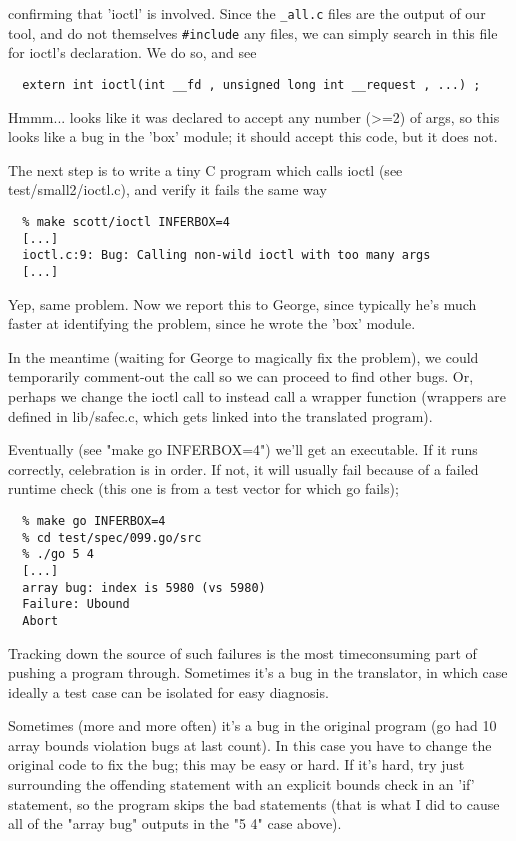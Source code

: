 \documentclass{book}
\def\t#1{{\tt #1}}
\begin{document}
confirming that 'ioctl' is involved.  Since the \t{*\_all.c} files are the
output of our tool, and do not themselves \t{\#include} any files, we can
simply search in this file for ioctl's declaration.  We do so, and see

\begin{verbatim}
  extern int ioctl(int __fd , unsigned long int __request , ...) ;
\end{verbatim}
  
Hmmm... looks like it was declared to accept any number (>=2) of args, so
this looks like a bug in the 'box' module; it should accept this code,
but it does not.

The next step is to write a tiny C program which calls ioctl (see
test/small2/ioctl.c), and verify it fails the same way

\begin{verbatim}
  % make scott/ioctl INFERBOX=4
  [...]
  ioctl.c:9: Bug: Calling non-wild ioctl with too many args
  [...]
\end{verbatim}
  
Yep, same problem.  Now we report this to George, since typically he's
much faster at identifying the problem, since he wrote the 'box' module.

In the meantime (waiting for George to magically fix the problem), we
could temporarily comment-out the call so we can proceed to find other
bugs.  Or, perhaps we change the ioctl call to instead call a wrapper
function (wrappers are defined in lib/safec.c, which gets linked into
the translated program).

Eventually (see "make go INFERBOX=4") we'll get an executable.  If it
runs correctly, celebration is in order.  If not, it will usually fail
because of a failed runtime check (this one is from a test vector for
which go fails);

\begin{verbatim}
  % make go INFERBOX=4
  % cd test/spec/099.go/src
  % ./go 5 4
  [...]
  array bug: index is 5980 (vs 5980)
  Failure: Ubound
  Abort
\end{verbatim}

Tracking down the source of such failures is the most timeconsuming
part of pushing a program through.  Sometimes it's a bug in the
translator, in which case ideally a test case can be isolated for easy
diagnosis.  

Sometimes (more and more often) it's a bug in the original program (go
had 10 array bounds violation bugs at last count).  In this case you
have to change the original code to fix the bug; this may be easy or
hard.  If it's hard, try just surrounding the offending statement with
an explicit bounds check in an 'if' statement, so the program skips
the bad statements (that is what I did to cause all of the "array bug"
outputs in the "5 4" case above).
\end{document}
